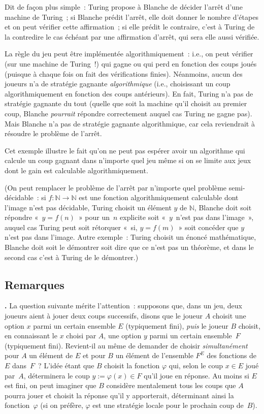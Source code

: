 \documentclass[12pt,a4paper]{article}
\theoremstyle{definition}
\newcommand\thingy{%
\refstepcounter{comcnt}\smallskip\noindent\textbf{\thecomcnt.} }
\begin{document}
Dit de façon plus simple : Turing propose à Blanche de décider l'arrêt
d'une machine de Turing ; si Blanche prédit l'arrêt, elle doit donner
le nombre d'étapes et on peut vérifier cette affirmation ; si elle
prédit le contraire, c'est à Turing de la contredire le cas échéant
par une affirmation d'arrêt, qui sera elle aussi vérifiée.

La règle du jeu peut être implémentée algorithmiquement : i.e., on
peut vérifier (sur une machine de Turing !) qui gagne ou qui perd en
fonction des coups joués (puisque à chaque fois on fait des
vérifications finies).  Néanmoins, aucun des joueurs n'a de stratégie
gagnante \emph{algorithmique} (i.e., choisissant un coup
algorithmiquement en fonction des coups antérieurs).  En fait, Turing
n'a pas de stratégie gagnante du tout (quelle que soit la machine
qu'il choisit au premier coup, Blanche \emph{pourrait} répondre
correctement auquel cas Turing ne gagne pas).  Mais Blanche n'a pas de
stratégie gagnante algorithmique, car cela reviendrait à résoudre le
problème de l'arrêt.

Cet exemple illustre le fait qu'on ne peut pas espérer avoir un
algorithme qui calcule un coup gagnant dans n'importe quel jeu même si
on se limite aux jeux dont le gain est calculable algorithmiquement.

(On peut remplacer le problème de l'arrêt par n'importe quel problème
semi-décidable : si $f \colon \mathbb{N} \to \mathbb{N}$ est une
fonction algorithmiquement calculable dont l'image n'est pas
décidable, Turing choisit un élément $y$ de $\mathbb{N}$, Blanche doit
soit répondre « $y=f(n)$ » pour un $n$ explicite soit « $y$ n'est pas
  dans l'image », auquel cas Turing peut soit rétorquer « si, $y =
  f(m)$ » soit concéder que $y$ n'est pas dans l'image.  Autre
exemple : Turing choisit un énoncé mathématique, Blanche doit soit le
démontrer soit dire que ce n'est pas un théorème, et dans le second
cas c'est à Turing de le démontrer.)


\subsection{Remarques}

\thingy\label{question-preposing-moves} La question suivante mérite
l'attention : supposons que, dans un jeu, deux joueurs aient à jouer
deux coups successifs, disons que le joueur $A$ choisit une option $x$
parmi un certain ensemble $E$ (typiquement fini), \emph{puis} le
joueur $B$ choisit, en connaissant le $x$ choisi par $A$, une option
$y$ parmi un certain ensemble $F$ (typiquement fini).  Revient-il au
même de demander de choisir \emph{simultanément} pour $A$ un élément
de $E$ et pour $B$ un élément de l'ensemble $F^E$ des fonctions de $E$
dans $F$ ?  L'idée étant que $B$ choisit la fonction $\varphi$ qui,
selon le coup $x \in E$ joué par $A$, déterminera le coup $y :=
\varphi(x) \in F$ qu'il joue en réponse.  Au moins si $E$ est fini, on
peut imaginer que $B$ considère mentalement tous les coups que $A$
pourra jouer et choisit la réponse qu'il y apporterait, déterminant
ainsi la fonction $\varphi$ (si on préfère, $\varphi$ est une
stratégie locale pour le prochain coup de $B$).
\end{document}

